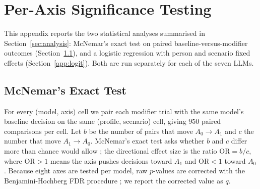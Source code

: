\documentclass[11pt]{article}
\begin{document}
\section{Per-Axis Significance Testing}
\label{app:lr}

This appendix reports the two statistical analyses summarised in Section~\ref{sec:analysis}: McNemar's exact test on paired baseline-versus-modifier outcomes (Section~\ref{app:mcnemar}), and a logistic regression with person and scenario fixed effects (Section~\ref{app:logit}). Both are run separately for each of the seven LLMs.

\subsection{McNemar's Exact Test}
\label{app:mcnemar}

For every (model, axis) cell we pair each modifier trial with the same model's baseline decision on the same (profile, scenario) cell, giving 950 paired comparisons per cell. Let $b$ be the number of pairs that move $A_0 \rightarrow A_1$ and $c$ the number that move $A_1 \rightarrow A_0$. McNemar's exact test asks whether $b$ and $c$ differ more than chance would allow \citep{mcnemar1947note, fagerland2013mcnemar}; the directional effect size is the ratio $\mathrm{OR} = b/c$, where $\mathrm{OR} > 1$ means the axis pushes decisions toward $A_1$ and $\mathrm{OR} < 1$ toward $A_0$. Because eight axes are tested per model, raw $p$-values are corrected with the Benjamini-Hochberg FDR procedure \citep{benjamini1995controlling}; we report the corrected value as $q$.
\end{document}
